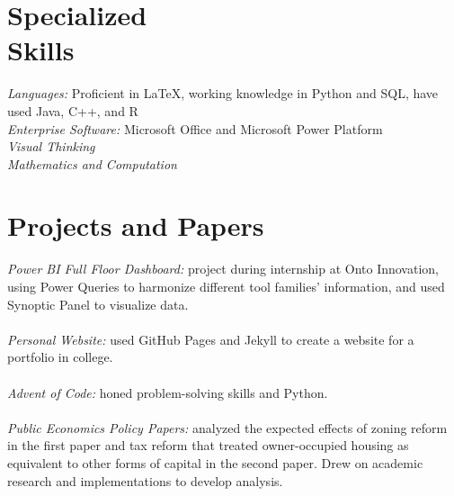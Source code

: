 \documentclass[margin, 12pt]{res} %
\begin{document}
\begin{resume}

\section{\sc Specialized \\ Skills} 

{\sl Languages:} Proficient in \LaTeX, working knowledge in Python and SQL, have used Java, C++, and R\\
{\sl Enterprise Software:} Microsoft Office and Microsoft Power Platform\\
{\sl Visual Thinking}\\
{\sl Mathematics and Computation}

\section{\sc Projects and Papers}
{\sl Power BI Full Floor Dashboard:} project during internship at Onto Innovation, using Power Queries to harmonize different tool families' information, and used Synoptic Panel to visualize data.\\
\vspace{4pt}\\
{\sl Personal Website:} used GitHub Pages and Jekyll to create a website for a portfolio in college.\\
\vspace{4pt}\\
{\sl Advent of Code:} honed problem-solving skills and Python.\\
\vspace{4pt}\\
{\sl Public Economics Policy Papers:} analyzed the expected effects of zoning reform in the first paper and tax reform that treated owner-occupied housing as equivalent to other forms of capital in the second paper. Drew on academic research and implementations to develop analysis.\\
\vspace{4pt}\\

\end{resume}
\end{document}
